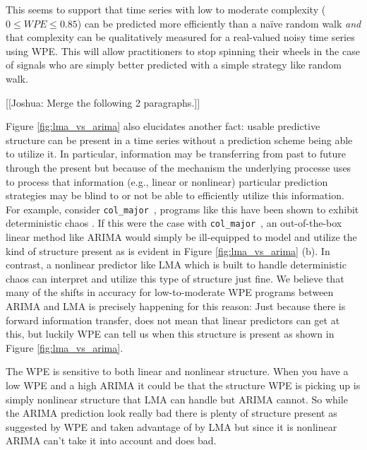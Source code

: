 \documentclass{article}
\newcommand{\col}{{\tt col\_major}~}
\begin{document}
This seems to support that time series with low to moderate complexity ($0\le WPE \le 0.85$) can be predicted more efficiently than a na\"ive random walk \emph{and} that complexity can be qualitatively measured for a real-valued noisy time series using WPE. This will allow practitioners to stop spinning their wheels in the case of signals who are simply better predicted with a simple strategy like random walk. 

















[[Joshua: Merge the following 2 paragraphs.]]

Figure \ref{fig:lma_vs_arima} also elucidates another fact: usable predictive structure can be present in a time series without a prediction scheme being able to utilize it. In particular, information may be transferring from past to future through the present but because of the mechanism the underlying processe uses to process that information  (e.g., linear or nonlinear) particular prediction strategies may be blind to or not be able to efficiently utilize this information. For example, consider \col, programs like this have been shown to exhibit deterministic chaos \cite{mytkowicz09}. If this were the case with \col, an out-of-the-box linear method like ARIMA would simply be ill-equipped to model and utilize the kind of structure present as is evident in Figure \ref{fig:lma_vs_arima} (b). In contrast, a nonlinear predictor like LMA which is built to handle deterministic chaos can interpret and utilize this type of structure just fine. We believe that many of the shifts in accuracy for low-to-moderate WPE programs between ARIMA and LMA is precisely happening for this reason: Just because there is forward information transfer, does not mean that linear predictors can get at this, but luckily WPE can tell us when this structure is present as shown in Figure \ref{fig:lma_vs_arima}.


The WPE is sensitive to both linear and nonlinear structure. When you have a low
WPE and a high ARIMA it could be that the structure WPE is picking up is simply
nonlinear structure that LMA can handle but ARIMA cannot. So while the ARIMA
prediction look really bad there is plenty of structure present as suggested by
WPE and taken advantage of by LMA but since it is nonlinear ARIMA can't take it
into account and does bad.
\end{document}
